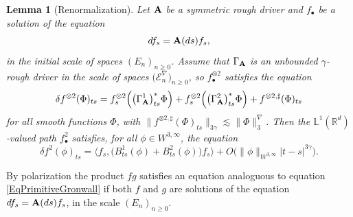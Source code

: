 \documentclass[11pt,a4paper]{amsart}
\newcommand{\RR}{\mathbb{R}}  \newcommand{\CC}{\mathbb{C}}  \newcommand{\LL}{\mathbb{L}}  \newcommand{\WW}{\mathbb{W}}
\newcommand{\mcE}{\mathcal{E}}
\renewcommand{\geq}{\geqslant}
\newcommand{\ssk}{\smallskip}
\newtheorem{lem}[thm]{\hspace{-0.15cm}  {\sc Lemma} }%
\numberwithin{equation}{section} %
\begin{document}
\ssk

\begin{lem}[Renormalization]
\label{LemmaRenormalization}
Let $\bf A$ be a symmetric rough driver and $f_\bullet$ be a solution of the equation 
$$
df_s = {\bf A}(ds)f_s,
$$ 
in the initial scale of spaces $(E_n)_{n\geq 0}$. Assume that $\Gamma_{\bf A}$ is an unbounded $\gamma$-rough driver in the scale of spaces $\big(\mcE^\nabla_n\big)_{n\geq 0}$, so $f_\bullet^{\otimes 2}$ satisfies the equation
\begin{equation}
\label{EqFOtimes2}
\delta f^{\otimes 2}(\Phi)_{ts} = f^{\otimes 2}_s\Big(\big(\Gamma_{\bf A}^1\big)^*_{ts}\Phi\Big) + f^{\otimes 2}_s\Big(\big(\Gamma_{\bf A}^2\big)^*_{ts}\Phi\Big) +  f^{\otimes 2,\sharp}(\Phi)_{ts}
\end{equation}
for all smooth functions $\Phi$, with $\big\|f^{\otimes 2,\sharp}(\Phi)_{ts}\big\|_{3\gamma}\lesssim \big\| \Phi\big\|^\nabla_3$. Then the $\LL^1(\RR^d)$-valued path $f^2_\bullet$ satisfies, for all $\phi \in W^{3,\infty}$, the equation
\begin{equation} 
\label{EqPrimitiveGronwall}
\delta f^2(\phi)_{ts} =  \Big\langle f_s , \big(B^1_{ts}(\phi) + B^2_{ts}(\phi)\big) f_s\Big\rangle  + O \Big(\| \phi \|_{W^{3,\infty}} | t - s |^{3 \gamma}\Big) .
\end{equation}
 \end{lem}

\ssk
 
\noindent By polarization the product $fg$ satisfies an equation analoguous to equation \eqref{EqPrimitiveGronwall} if both $f$ and $g$ are solutions of the equation $df_s = {\bf A}(ds)f_s$, in the scale $(E_n)_{n\geq 0}$.

\bigskip
\end{document}
